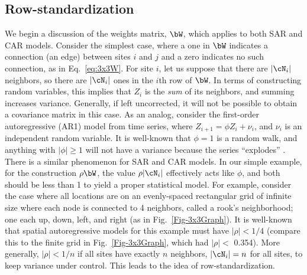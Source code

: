 
\subsection*{Row-standardization}

We begin a discussion of the weights matrix, $\bW$, which applies to both SAR and CAR models.  Consider the simplest case, where a one in $\bW$ indicates a connection (an edge) between sites $i$ and $j$ and a zero indicates no such connection, as in Eq.~\ref{eq:3x3W}.  For site $i$, let us suppose that there are $|\cN_i|$ neighbors, so there are $|\cN_i|$ ones in the $i$th row of $\bW$.  In terms of constructing random variables, this implies that $Z_i$ is the \textit{sum} of its neighbors, and summing increases variance.  Generally, if left uncorrected, it will not be possible to obtain a covariance matrix in this case. As an analog, consider the first-order autoregressive (AR1) model from time series, where $Z_{i+1} = \phi Z_i + \nu_i$, and $\nu_i$ is an independent random variable.  It is well-known that $\phi = 1$ is a random walk, and anything with $|\phi| \geq 1$ will not have a variance because the series ``explodes'' \citep[e.g.,][pg. 53]{Hami:time:1994}.  There is a similar phenomenon for SAR and CAR models. In our simple example, for the construction $\rho\bW$, the value  $\rho |\cN_i|$ effectively acts like $\phi$, and both should be less than 1 to yield a proper statistical model. For example, consider the case where all locations are on an evenly-spaced rectangular grid of infinite size where each node is connected to 4 neighbors, called a rook's neighborhood; one each up, down, left, and right (as in Fig.~\ref{Fig-3x3Graph}). It is well-known that spatial autoregressive models for this example must have $|\rho| < 1/4$ \citep[pg. 82]{Hain:spat:1990} (compare this to the finite grid in Fig.~\ref{Fig-3x3Graph}, which had $|\rho| <$ 0.354). More generally, $|\rho| < 1/n$ if all sites have exactly $n$ neighbors, $|\cN_i| = n$ for all sites, to keep variance under control. This leads to the idea of row-standardization.  

